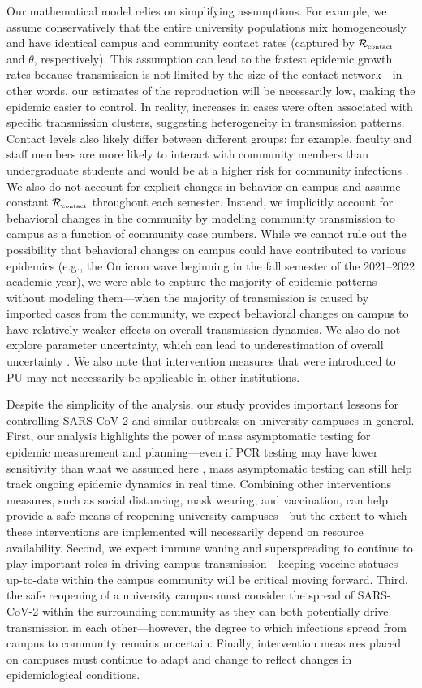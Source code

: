 \documentclass[12pt]{article}
\newcommand{\Rx}[1]{\ensuremath{{\mathcal R}_{#1}}}
\newcommand{\Rc}{\Rx{\textrm{\tiny{contact}}}}
\begin{document}
Our mathematical model relies on simplifying assumptions.
For example, we assume conservatively that the entire university populations mix homogeneously and have identical campus and community contact rates (captured by $\Rc$ and $\theta$, respectively).
This assumption can lead to the fastest epidemic growth rates because transmission is not limited by the size of the contact network---in other words, our estimates of the reproduction will be necessarily low, making the epidemic easier to control.
In reality, increases in cases were often associated with specific transmission clusters, suggesting heterogeneity in transmission patterns.
Contact levels also likely differ between different groups:
for example, faculty and staff members are more likely to interact with community members than undergraduate students and would be at a higher risk for community infections \citep{frazier2022modeling}.
We also do not account for explicit changes in behavior on campus and assume constant $\Rc$ throughout each semester.
Instead, we implicitly account for behavioral changes in the community by modeling community transmission to campus as a function of community case numbers.
While we cannot rule out the possibility that behavioral changes on campus could have contributed to various epidemics (e.g., the Omicron wave beginning in the fall semester of the 2021--2022 academic year), we were able to capture the majority of epidemic patterns without modeling them---when the majority of transmission is caused by imported cases from the community, we expect behavioral changes on campus to have relatively weaker effects on overall transmission dynamics.
We also do not explore parameter uncertainty, which can lead to underestimation of overall uncertainty \citep{elderd2006uncertainty}. 
We also note that intervention measures that were introduced to PU may not necessarily be applicable in other institutions.

Despite the simplicity of the analysis, our study provides important lessons for controlling SARS-CoV-2 and similar outbreaks on university campuses in general.
First, our analysis highlights the power of mass asymptomatic testing for epidemic measurement and planning---even if PCR testing may have lower sensitivity than what we assumed here \citep{hellewell2021estimating}, mass asymptomatic testing can still help track ongoing epidemic dynamics in real time.
Combining other interventions measures, such as social distancing, mask wearing, and vaccination, can help provide a safe means of reopening university campuses---but the extent to which these interventions are implemented will necessarily depend on resource availability.
Second, we expect immune waning and superspreading to continue to play important roles in driving campus transmission---keeping vaccine statuses up-to-date within the campus community will be critical moving forward.
Third, the safe reopening of a university campus must consider the spread of SARS-CoV-2 within the surrounding community as they can both potentially drive transmission in each other---however, the degree to which infections spread from campus to community remains uncertain.
Finally, intervention measures placed on campuses must continue to adapt and change to reflect changes in epidemiological conditions.
\end{document}
